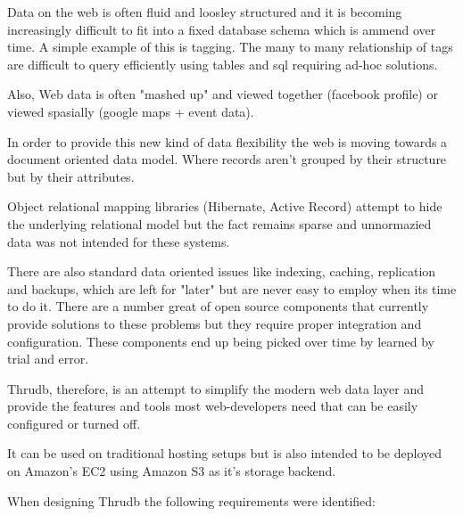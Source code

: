 \documentclass[nocopyrightspace,blockstyle]{sigplanconf}
\begin{document}
Data on the web is often fluid and loosley structured and it is becoming increasingly difficult to fit into a fixed database schema which is ammend over time.
A simple example of this is tagging. The many to many relationship of tags are difficult to query efficiently using tables and sql requiring ad-hoc solutions.

Also, Web data is often "mashed up" and viewed together (facebook profile) or viewed spasially (google maps + event data). 

In order to provide this new kind of data flexibility the web is moving towards a document oriented data model.  Where records aren't grouped by their structure but by their attributes.  

Object relational mapping libraries (Hibernate, Active Record) attempt to hide the underlying relational model but the fact remains sparse and unnormazied data was not intended for these systems. 

There are also standard data oriented issues like indexing, caching, replication and backups, which are left for "later" but are never easy to employ when its time to do it.
There are a number great of open source components that currently provide solutions to these problems but they require proper integration and configuration.  These components end up being picked over time by learned by trial and error.

Thrudb, therefore, is an attempt to simplify the modern web data layer and provide the features and tools most web-developers need that can be easily configured or turned off.

It can be used on traditional hosting setups but is also intended to be deployed on Amazon's EC2 using Amazon S3 as it's storage backend.

When designing Thrudb the following requirements were identified:
\end{document}
